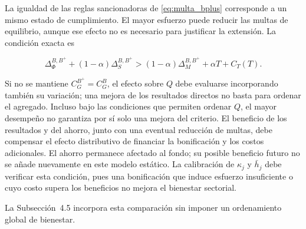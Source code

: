 La igualdad de las reglas sancionadoras de \eqref{eq:multa_bplus} corresponde a un mismo estado de cumplimiento. El mayor esfuerzo puede reducir las multas de equilibrio, aunque ese efecto no es necesario para justificar la extensión. La condición exacta es

\begin{equation}
\label{eq:condicion_bienestar_bplus}
\Delta_\Phi^{B,B^+}+(1-\alpha)\Delta_S^{B,B^+}>(1-\alpha)\Delta_M^{B,B^+}+\alpha T+C_T(T).
\end{equation}

Si no se mantiene \(C_G^{B^{+}}=C_G^B\), el efecto sobre \(Q\) debe evaluarse incorporando también su variación; una mejora de los resultados directos no basta para ordenar el agregado. Incluso bajo las condiciones que permiten ordenar \(Q\), el mayor desempeño no garantiza por sí solo una mejora del criterio. El beneficio de los resultados y del ahorro, junto con una eventual reducción de multas, debe compensar el efecto distributivo de financiar la bonificación y los costos adicionales. El ahorro permanece afectado al fondo; su posible beneficio futuro no se añade nuevamente en este modelo estático. La calibración de \(\kappa_j\) y \(\bar h_j\) debe verificar esta condición, pues una bonificación que induce esfuerzo insuficiente o cuyo costo supera los beneficios no mejora el bienestar sectorial.

La Subsección~4.5 incorpora esta comparación sin imponer un ordenamiento global de bienestar.
